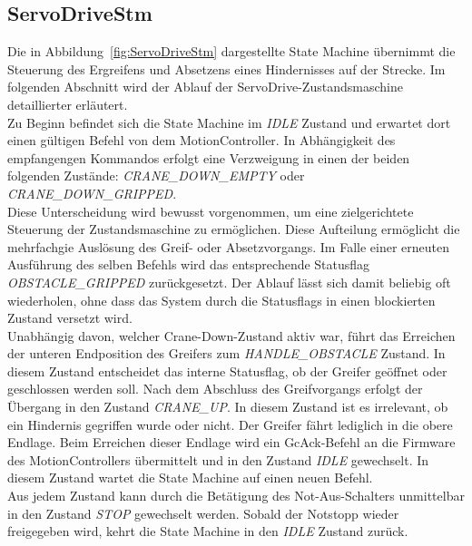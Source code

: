 \documentclass[main.tex]{subfiles} %
\begin{document}
\subsection{ServoDriveStm}
Die in Abbildung~\ref{fig:ServoDriveStm} dargestellte State Machine übernimmt die Steuerung des Ergreifens und Absetzens eines Hindernisses auf der Strecke.
Im folgenden Abschnitt wird der Ablauf der ServoDrive-Zustandsmaschine detaillierter erläutert.\\
Zu Beginn befindet sich die State Machine im \textit{IDLE} Zustand und erwartet dort einen gültigen Befehl von dem MotionController.
In Abhängigkeit des empfangengen Kommandos erfolgt eine Verzweigung in einen der beiden folgenden Zustände:
\textit{CRANE\_DOWN\_EMPTY} oder \textit{CRANE\_DOWN\_GRIPPED}.\\
Diese Unterscheidung wird bewusst vorgenommen, um eine zielgerichtete Steuerung der Zustandsmaschine zu ermöglichen.
Diese Aufteilung ermöglicht die mehrfachgie Auslösung des Greif- oder Absetzvorgangs. Im Falle einer erneuten Ausführung des selben
Befehls wird das entsprechende Statusflag \textit{OBSTACLE\_GRIPPED} zurückgesetzt. Der Ablauf lässt sich damit beliebig oft wiederholen,
ohne dass das System durch die Statusflags in einen blockierten Zustand versetzt wird.\\
Unabhängig davon, welcher Crane-Down-Zustand aktiv war, führt das Erreichen der unteren Endposition des Greifers
zum \textit{HANDLE\_OBSTACLE} Zustand. In diesem Zustand entscheidet das interne Statusflag, ob der Greifer geöffnet
oder geschlossen werden soll. Nach dem Abschluss des Greifvorgangs erfolgt der Übergang in den Zustand \textit{CRANE\_UP}.
In diesem Zustand ist es irrelevant, ob ein Hindernis gegriffen wurde oder nicht. Der Greifer fährt lediglich in die obere Endlage.
Beim Erreichen dieser Endlage wird ein GcAck-Befehl an die Firmware des MotionControllers übermittelt und in 
den Zustand \textit{IDLE} gewechselt. In diesem Zustand wartet die State Machine auf einen neuen Befehl.\\
Aus jedem Zustand kann durch die Betätigung des Not-Aus-Schalters unmittelbar in den Zustand \textit{STOP} gewechselt
werden. Sobald der Notstopp wieder freigegeben wird, kehrt die State Machine in den \textit{IDLE} Zustand zurück.
\end{document}
